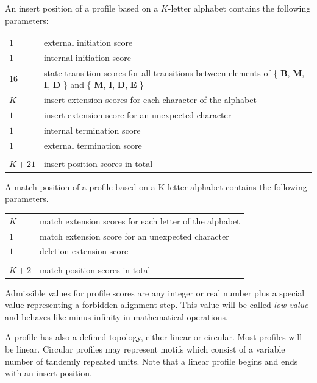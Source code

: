 \documentclass[a4paper,10pt,twoside]{scrartcl}
\begin{document}
  An insert position of a profile based on a $K$-letter alphabet contains the following parameters:
  \begin{center}
  \begin{tabular}{ll}
   $1$ & external initiation score\\
   $1$ & internal initiation score\\
   $16$ & state transition scores for all transitions between elements of \{ \textbf{B}, \textbf{M}, \textbf{I}, \textbf{D} \} and \{ \textbf{M}, \textbf{I}, \textbf{D}, \textbf{E} \} \\
   $K$ & insert extension scores for each character of the alphabet\\
   $1$ & insert extension score for an unexpected character\\
   $1$ & internal termination score\\
   $1$ & external termination score\\
  \hline\\
  $K+21$ & insert position scores in total
  \end{tabular}
  \end{center}
  
  A match position of a profile based on a K-letter alphabet contains the following parameters.
  \begin{center}
  \begin{tabular}{ll}
   $K$ & match extension scores for each letter of the alphabet\\
   $1$ & match extension score for an unexpected character\\
   $1$ & deletion extension score\\
  \hline \\
  $K+2$ & match position scores in total
  \end{tabular}
  \end{center}
  
  Admissible values for profile scores are any integer or real number plus a special value representing a forbidden alignment step. This value will be
  called \emph{low-value} and behaves like minus infinity in mathematical operations.

  A profile has also a defined topology, either linear or circular.  Most profiles will be linear.  Circular profiles may represent motifs which
  consist of a variable number of tandemly repeated units.  Note that a linear profile begins and ends with an insert position.
\end{document}
